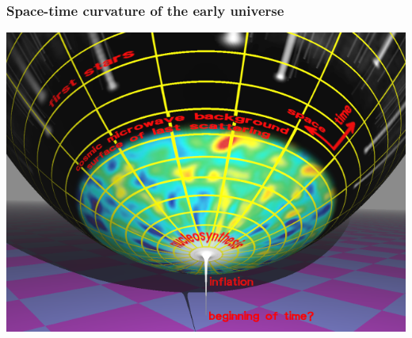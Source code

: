 \documentclass[compress]{beamer}
\begin{document}
\begin{frame}
\frametitle{Space-time curvature of the early universe}

\begin{center}
\includegraphics[width=0.95\linewidth]{pictures/big_bang_manifold.png}
\end{center}
\end{frame}
\end{document}
